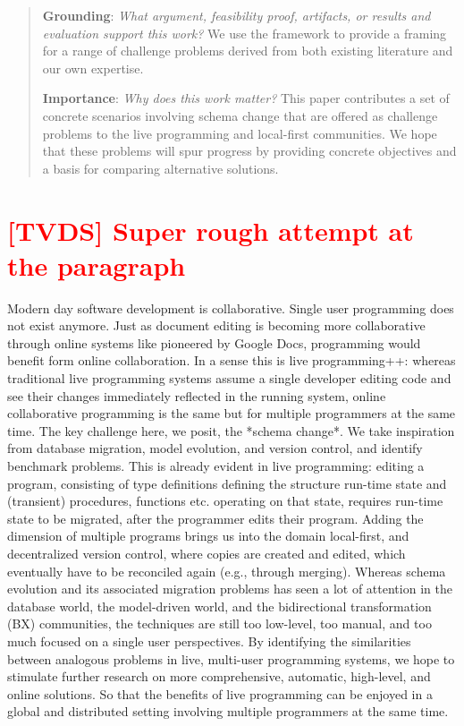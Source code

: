 \documentclass[english,submission]{programming}
\begin{document}
\begin{abstract}
\noindent\textbf{Grounding}: \emph{What argument, feasibility proof, artifacts, or results and evaluation support this work?}
We use the framework to provide a framing for a range of challenge problems derived from both
existing literature and our own expertise.

\noindent\textbf{Importance}: \emph{Why does this work matter?}
This paper contributes a set of concrete scenarios involving schema change that are offered as
challenge problems to the live programming and local-first communities. We hope that these
problems will spur progress by providing concrete objectives and a basis for comparing alternative
solutions.

\end{abstract}


\section{\textcolor{red}{[TVDS] Super rough attempt at the paragraph}}

Modern day software development is collaborative. Single user programming does not exist anymore.
Just as document editing is becoming more collaborative through online systems like pioneered by Google Docs,
programming would benefit form online collaboration. In a sense this is live programming++: whereas traditional
live programming systems assume a single developer editing code and see their changes immediately reflected
in the running system, online collaborative programming is the same but for multiple programmers at the same time.
The key challenge here, we posit, the *schema change*. We take inspiration from database migration,
model evolution, and version control, and identify benchmark problems. This is already evident in live programming:
editing a program, consisting of type definitions defining the structure run-time state and (transient) procedures, functions
etc. operating on that state, requires run-time state to be migrated, after the programmer edits their program.
Adding the dimension of multiple programs brings us into the domain local-first, and decentralized version control, where
copies are created and edited, which eventually have to be reconciled again (e.g., through merging).
Whereas schema evolution and its associated migration problems has seen a lot of attention in the database world,
the model-driven world, and the bidirectional transformation (BX) communities, the techniques are still too low-level,
too manual, and too much focused on a single user perspectives. By identifying the similarities between analogous
problems in live, multi-user programming systems, we hope to stimulate further research on more comprehensive, automatic,
high-level, and online solutions. So that the benefits of live programming can be enjoyed in a global and distributed setting
involving multiple programmers at the same time.
\end{document}

